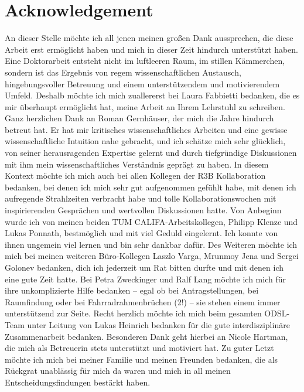 \section*{Acknowledgement}
An dieser Stelle möchte ich all jenen meinen großen Dank aussprechen, die diese Arbeit erst ermöglicht haben und mich in dieser Zeit hindurch unterstützt haben. Eine Doktorarbeit entsteht nicht im luftleeren Raum, im stillen Kämmerchen, sondern ist das Ergebnis von regem wissenschaftlichen Austausch, hingebungsvoller Betreuung und einem unterstützendem und motivierendem Umfeld.\newline
Deshalb möchte ich mich zuallererst bei Laura Fabbietti bedanken, die es mir überhaupt ermöglicht hat, meine Arbeit an Ihrem Lehrstuhl zu schreiben. \newline
Ganz herzlichen Dank an Roman Gernhäuser, der mich die Jahre hindurch betreut hat. Er hat mir kritisches wissenschaftliches Arbeiten und eine gewisse wissenschaftliche Intuition nahe gebracht, und ich schätze mich sehr glücklich, von seiner herausragenden Expertise gelernt und durch tiefgründige Diskussionen mit ihm mein wissenschaftliches Verständnis geprägt zu haben.\newline
In diesem Kontext möchte ich mich auch bei allen Kollegen der R3B Kollaboration bedanken, bei denen ich mich sehr gut aufgenommen gefühlt habe, mit denen ich aufregende Strahlzeiten verbracht habe und tolle Kollaborationswochen mit inspirierenden Gesprächen und wertvollen Diskussionen hatte.\newline
Von Anbeginn wurde ich von meinen beiden TUM CALIFA-Arbeitskollegen, Philipp Klenze und Lukas Ponnath, bestmöglich und mit viel Geduld eingelernt. Ich konnte von ihnen ungemein viel lernen und bin sehr dankbar dafür.\newline
Des Weiteren möchte ich mich bei meinen weiteren Büro-Kollegen Laszlo Varga, Mrunmoy Jena und Sergei Golonev bedanken, dich ich jederzeit um Rat bitten durfte und mit denen ich eine gute Zeit hatte.\newline
Bei Petra Zweckinger und Ralf Lang möchte ich mich für ihre unkomplizierte Hilfe bedanken – egal ob bei Antragstellungen, bei Raumfindung oder bei Fahrradrahmenbrüchen (2!) – sie stehen einem immer unterstützend zur Seite.\newline
Recht herzlich möchte ich mich beim gesamten ODSL-Team unter Leitung von Lukas Heinrich bedanken für die gute interdisziplinäre Zusammenarbeit bedanken. Besonderen Dank geht hierbei an Nicole Hartman, die mich als Betreuerin stets unterstützt und motiviert hat. \newline
Zu guter Letzt möchte ich mich bei meiner Familie und meinen Freunden bedanken, die als Rückgrat unablässig für mich da waren und mich in all meinen Entscheidungsfindungen bestärkt haben.\newline
